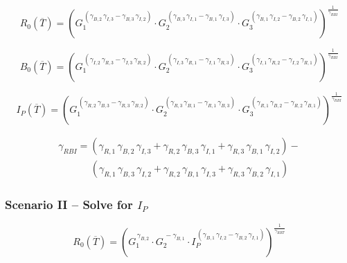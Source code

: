 \begin{equation}
	\label{eq:case_1_R}
	R_0( \overline T) = \left( 
	G_1 ^ {  \, ( \gamma_{B,2} \, \gamma_{I,3} - \gamma_{B,3} \, \gamma_{I,2} ) } \cdot 
	G_2 ^ {  \, ( \gamma_{B,3} \, \gamma_{I,1} - \gamma_{B,1} \, \gamma_{I,3} ) } \cdot 
	G_3 ^ {  \, ( \gamma_{B,1} \, \gamma_{I,2} - \gamma_{B,2} \, \gamma_{I,1} ) }\right)^{ \frac{1}{\gamma_{RBI}} }
\end{equation}

\begin{equation}
	\label{eq:case_1_B}
	B_0( \overline T) = \left( 
	G_1 ^ {  \, ( \gamma_{I,2} \, \gamma_{R,3} - \gamma_{I,3} \, \gamma_{R,2} ) } \cdot 
	G_2 ^ {  \, ( \gamma_{I,3} \, \gamma_{R,1} - \gamma_{I,1} \, \gamma_{R,3} ) } \cdot 
	G_3 ^ {  \, ( \gamma_{I,1} \, \gamma_{R,2} - \gamma_{I,2} \, \gamma_{R,1} ) }\right)^{ \frac{1}{\gamma_{RBI}} }
\end{equation}

\begin{equation}
	\label{eq:case_1_I}
	I_P( \overline T) = \left( 
	G_1 ^ {  \, ( \gamma_{R,2} \, \gamma_{B,3} - \gamma_{R,3} \, \gamma_{B,2} ) } \cdot 
	G_2 ^ {  \, ( \gamma_{R,3} \, \gamma_{B,1} - \gamma_{R,1} \, \gamma_{B,3} ) } \cdot 
	G_3 ^ {  \, ( \gamma_{R,1} \, \gamma_{B,2} - \gamma_{R,2} \, \gamma_{B,1} ) }\right)^{ \frac{1}{\gamma_{RBI}} }
\end{equation}

\begin{gather}
	\label{eq:case_1_gamma}
	\gamma_{RBI} = ( \gamma_{R,1} \, \gamma_{B,2} \, \gamma_{I,3} +  \gamma_{R,2} \, \gamma_{B,3} \, \gamma_{I,1} + \gamma_{R,3} \, \gamma_{B,1} \, \gamma_{I,2} ) - \\
	\ \ \ \ \ \ \ \ \ \ \ \ \ \ \ ( \gamma_{R,1} \, \gamma_{B,3} \, \gamma_{I,2} +  \gamma_{R,2} \, \gamma_{B,1} \, \gamma_{I,3} + \gamma_{R,3} \, \gamma_{B,2} \, \gamma_{I,1} ) \nonumber
\end{gather}

\subsubsection{Scenario II -- Solve for $I_P$}

\begin{equation}
	\label{eq:case_2_R}
	R_0( \overline T) = \left( 
	G_1 ^ {  \, \gamma_{B,2} } \cdot 
	G_2 ^ {  \, -\gamma_{B,1} } \cdot 
	I_P ^ {  \, ( \gamma_{B,1} \, \gamma_{I,2} - \gamma_{B,2} \, \gamma_{I,1} ) }\right)^{ \frac{1}{\gamma_{RBT}} }
\end{equation}

